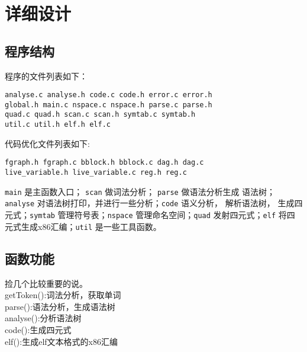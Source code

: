 \section{详细设计}
\subsection{程序结构}
程序的文件列表如下：
\begin{verbatim}
analyse.c analyse.h code.c code.h error.c error.h
global.h main.c nspace.c nspace.h parse.c parse.h
quad.c quad.h scan.c scan.h symtab.c symtab.h
util.c util.h elf.h elf.c
\end{verbatim}
代码优化文件列表如下:
\begin{verbatim}
fgraph.h fgraph.c bblock.h bblock.c dag.h dag.c
live_variable.h live_variable.c reg.h reg.c
\end{verbatim}
\verb|main| 是主函数入口； \verb|scan| 做词法分析； \verb|parse| 做语法分析生成
语法树； \verb|analyse| 对语法树打印，并进行一些分析；\verb|code| 语义分析，
解析语法树，
生成四元式；\verb|symtab| 管理符号表；\verb|nspace| 管理命名空间；\verb|quad|
发射四元式；\verb|elf| 将四元式生成x86汇编；\verb|util| 是一些工具函数。
\subsection{函数功能}
捡几个比较重要的说。\\
getToken():词法分析，获取单词\\
parse():语法分析，生成语法树\\
analyse():分析语法树\\
code():生成四元式\\
elf():生成elf文本格式的x86汇编
